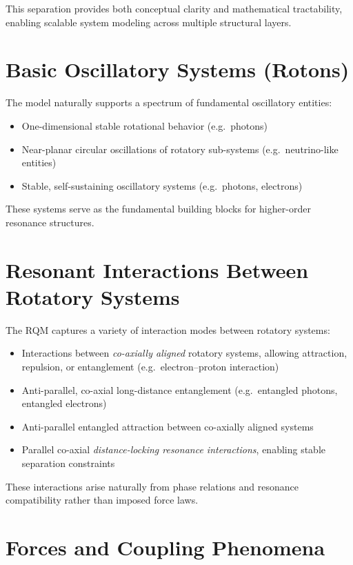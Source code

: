 This separation provides both conceptual clarity and mathematical tractability, enabling scalable system modeling across multiple structural layers.

\section{Basic Oscillatory Systems (Rotons)}

The model naturally supports a spectrum of fundamental oscillatory entities:

\begin{itemize}
  \item One-dimensional stable rotational behavior (e.g.\ photons)
  \item Near-planar circular oscillations of rotatory sub-systems (e.g.\ neutrino-like entities)
  \item Stable, self-sustaining oscillatory systems (e.g.\ photons, electrons)
\end{itemize}

These systems serve as the fundamental building blocks for higher-order resonance structures.

\section{Resonant Interactions Between Rotatory Systems}

The RQM captures a variety of interaction modes between rotatory systems:

\begin{itemize}
  \item Interactions between \emph{co-axially aligned} rotatory systems, allowing attraction, repulsion, or entanglement (e.g.\ electron--proton interaction)
  \item Anti-parallel, co-axial long-distance entanglement (e.g.\ entangled photons, entangled electrons)
  \item Anti-parallel entangled attraction between co-axially aligned systems
  \item Parallel co-axial \emph{distance-locking resonance interactions}, enabling stable separation constraints
\end{itemize}

These interactions arise naturally from phase relations and resonance compatibility rather than imposed force laws.

\section{Forces and Coupling Phenomena}

